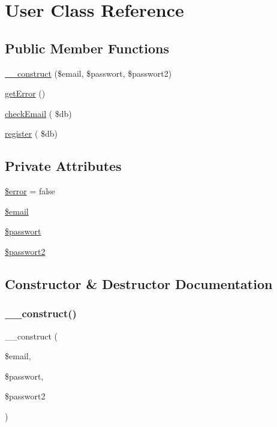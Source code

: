 \hypertarget{class_user}{}\section{User Class Reference}
\label{class_user}
\subsection*{Public Member Functions}
\begin{DoxyCompactItemize}
\item 
\mbox{\hyperlink{class_user_ace624806395273a85744163491e1b0a3}{\+\_\+\+\_\+construct}} (\$email, \$passwort, \$passwort2)
\item 
\mbox{\hyperlink{class_user_a24ada5decce3d1b79cd82f5a90ccf404}{get\+Error}} ()
\item 
\mbox{\hyperlink{class_user_a893a2fdb4d7e695912f02cf441d4c763}{check\+Email}} ( \$db)
\item 
\mbox{\hyperlink{class_user_a6a8d68e8d287e4af4be677b9b4849bb5}{register}} ( \$db)
\end{DoxyCompactItemize}
\subsection*{Private Attributes}
\begin{DoxyCompactItemize}
\item 
\mbox{\hyperlink{class_user_aeba2ab722cedda53dbb7ec1a59f45550}{\$error}} = false
\item 
\mbox{\hyperlink{class_user_ad634f418b20382e2802f80532d76d3cd}{\$email}}
\item 
\mbox{\hyperlink{class_user_aed302058273cfadf08c1752978ecbaf5}{\$passwort}}
\item 
\mbox{\hyperlink{class_user_a58d2858d5497e74ccacc622be54c23d4}{\$passwort2}}
\end{DoxyCompactItemize}


\subsection{Constructor \& Destructor Documentation}
\mbox{\label{class_user_ace624806395273a85744163491e1b0a3}} 
\subsubsection{\texorpdfstring{\_\_construct()}{\_\_construct()}}
{\footnotesize\ttfamily \+\_\+\+\_\+construct (\begin{DoxyParamCaption}\item[{}]{\$email,  }\item[{}]{\$passwort,  }\item[{}]{\$passwort2 }\end{DoxyParamCaption})}


